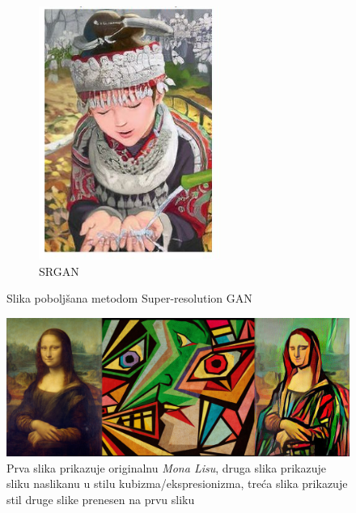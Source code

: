 \begin{enumerate}
\begin{figure}[htb]
\begin{subfigure}[b]{0.4\linewidth}
		\includegraphics[width=\linewidth]{img/SRGAN.png}
		\caption{SRGAN}
	\end{subfigure}
	\caption{Slika poboljšana metodom Super-resolution GAN \citep{SRGAN}}
	\label{img:SRGAN}
\end{figure}

\begin{figure}[htb]
	\centering
	\includegraphics[width=\linewidth]{img/StyleTransfer.png}
	\caption{Prva slika prikazuje originalnu \textit{Mona Lisu}, druga slika prikazuje sliku naslikanu u stilu kubizma/ekspresionizma, treća slika prikazuje stil druge slike prenesen na prvu sliku}
	\label{img:styleTransfer}
\end{figure}


\end{enumerate}
